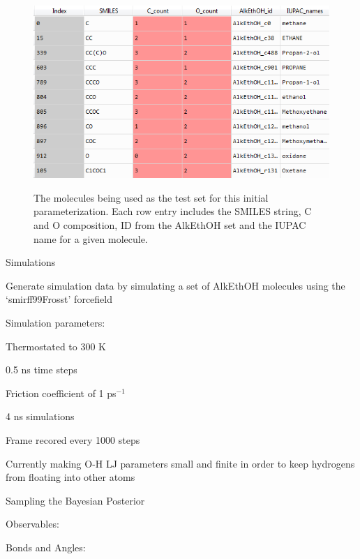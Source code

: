 \documentclass{report}
\begin{document}
\begin{outline}
\begin{outline}
\begin{outline}
\begin{figure}[h!]
      \includegraphics[width=.9\linewidth]{bayes1_mols.PNG}
      \label{fig:sub1}
      \caption{The molecules being used as the test set for this initial parameterization. Each row entry includes the SMILES string, C and O composition, 
               ID from the AlkEthOH set and the IUPAC name for a given molecule.}
      \end{figure}
    \end{outline}
    \item{Simulations}
    \begin{outline}
      \item{Generate simulation data by simulating a set of AlkEthOH molecules using the ‘smirff99Frosst’ forcefield}
      \item{Simulation parameters:}
      \begin{outline}
        \item{Thermostated to 300 K}
        \item{0.5 ns time steps}
        \item{Friction coefficient of 1 ps$^{-1}$}
        \item{4 ns simulations}
        \item{Frame recored every 1000 steps}
      \end{outline}
      \item{Currently making O-H LJ parameters small and finite in order to keep hydrogens from floating into other atoms}
    \end{outline}
    \item{Sampling the Bayesian Posterior}
    \begin{outline}
      \item{Observables:}
      \begin{outline}
        \item{Bonds and Angles:}
        \begin{outline}

\end{outline}
\end{outline}
\end{outline}
\end{outline}
\end{outline}
\end{document}
